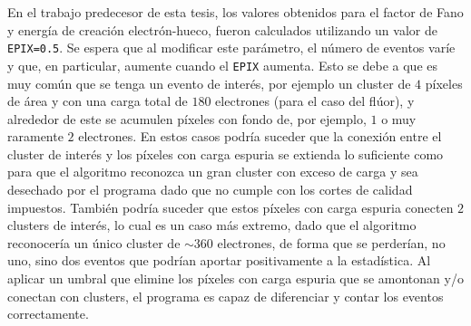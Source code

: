 En el trabajo predecesor de esta tesis\cite{TesisKevin}, los valores obtenidos para el factor de Fano y energía de creación electrón-hueco, fueron calculados utilizando un valor de \verb|EPIX=0.5|. Se espera que al modificar este parámetro, el número de eventos varíe y que, en particular, aumente cuando el \verb|EPIX| aumenta. 
Esto se debe a que es muy común que se tenga un evento de interés, por ejemplo un cluster de $4$ píxeles de área y con una carga total de $180$ electrones (para el caso del flúor), y alrededor de este se acumulen píxeles con fondo de, por ejemplo, $1$ o muy raramente $2$ electrones. 
En estos casos podría suceder que la conexión entre el cluster de interés y los píxeles con carga espuria se extienda lo suficiente como para que el algoritmo reconozca un gran cluster con exceso de carga y sea desechado por el programa dado que no cumple con los cortes de calidad impuestos. También podría suceder que estos píxeles con carga espuria conecten $2$ clusters de interés, lo cual es un caso más extremo, dado que el algoritmo reconocería un único cluster de $\sim 360$ electrones, de forma que se perderían, no uno, sino dos eventos que podrían aportar positivamente a la estadística. Al aplicar un umbral que elimine los píxeles con carga espuria que se amontonan y/o conectan con clusters, el programa es capaz de diferenciar y contar los eventos correctamente.

